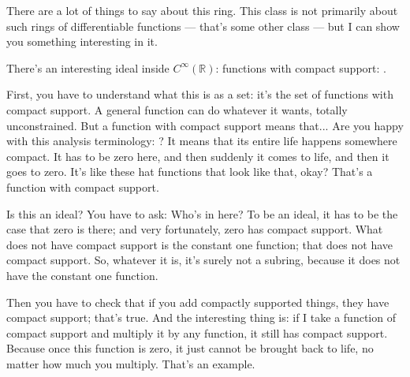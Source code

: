 \begin{speech}[00:59:33 - 01:01:30]
There are a lot of things to say about this ring. This class is not primarily about such rings of differentiable functions --- that's some other class --- but I can show you something interesting in it.

There's an interesting ideal inside $C^\infty(\mathbb{R})$:  functions with compact support: .

First, you have to understand what this is as a set: it's the set of functions with compact support. A general function can do whatever it wants, totally unconstrained. But a function with compact support means that... Are you happy with this analysis terminology: ? It means that its entire life happens somewhere compact. It has to be zero here, and then suddenly it comes to life, and then it goes to zero. It's like these hat functions that look like that, okay?  That's a function with compact support.

Is this an ideal? You have to ask: Who's in here? To be an ideal, it has to be the case that zero is there; and very fortunately, zero has compact support. What does not have compact support is the constant one function; that does not have compact support. So, whatever it is, it's surely not a subring, because it does not have the constant one function.

Then you have to check that if you add compactly supported things, they have compact support; that's true. And the interesting thing is: if I take a function of compact support and multiply it by any function, it still has compact support. Because once this function is zero, it just cannot be brought back to life, no matter how much you multiply. That's an example.
\end{speech}

